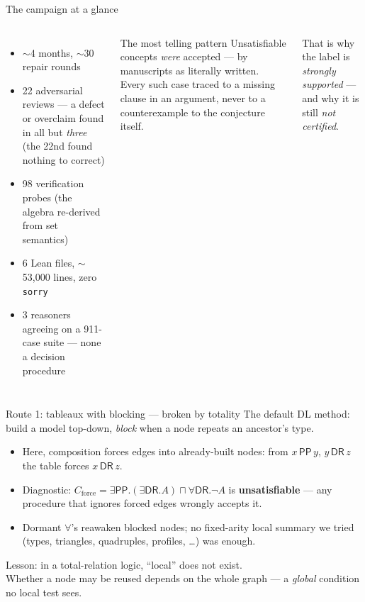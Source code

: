 \documentclass[aspectratio=169,11pt]{beamer}
\newcommand{\DR}{\mathsf{DR}}
\newcommand{\PP}{\mathsf{PP}}
\begin{document}
\begin{frame}{The campaign at a glance}
\begin{columns}[T]
\begin{itemize}
  \item $\sim$4 months, $\sim$\alert{30 repair rounds}
  \item \alert{22 adversarial reviews} --- a defect or overclaim found in
        all but \emph{three} (the 22nd found nothing to correct)
  \item \alert{98} verification probes (the algebra re-derived from set
        semantics)
  \item 6 Lean files, $\sim$\alert{53{,}000 lines}, \alert{zero \texttt{sorry}}
  \item 3 reasoners agreeing on a \alert{911-case} suite --- none a decision
        procedure
\end{itemize}
\begin{block}{The most telling pattern}
  Unsatisfiable concepts \emph{were} accepted --- by manuscripts as
  literally written. Every such case traced to a
  \alert{missing clause in an argument}, never to a counterexample to the
  conjecture itself.
\end{block}
\medskip
{\small That is why the label is \emph{strongly supported} --- and why it is
still \emph{not certified}.}
\end{columns}
\end{frame}

\begin{frame}{Route 1: tableaux with blocking --- broken by totality}
The default DL method: build a model top-down, \emph{block} when a node
repeats an ancestor's type.
\vfill
\begin{itemize}
  \item Here, composition forces edges \alert{into already-built nodes}:
        from $x\,\PP\,y$, $y\,\DR\,z$ the table forces $x\,\DR\,z$.
  \item Diagnostic: \;
        $C_{\mathrm{force}}=\exists\PP.(\exists\DR.A)\sqcap\forall\DR.\neg A$
        \; is \textbf{unsatisfiable} --- any procedure that ignores forced
        edges wrongly accepts it.
  \item Dormant $\forall$'s reawaken blocked nodes; no fixed-arity local
        summary we tried (types, triangles, quadruples, profiles, \dots) was enough.
\end{itemize}
\vfill
\begin{center}
\alert{Lesson: in a total-relation logic, ``local'' does not exist.}\\
Whether a node may be reused depends on the whole graph --- a \emph{global} condition no local test sees.
\end{center}
\end{frame}
\end{document}
